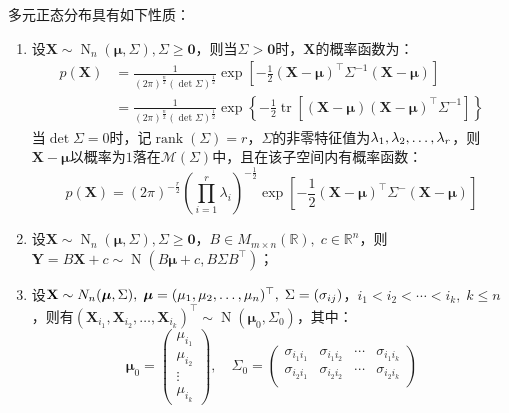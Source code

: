 \begin{property}\label{prop:MultiNormal}
	多元正态分布具有如下性质：
	\begin{enumerate}
		\item 设$\mathbf{X}\sim\operatorname{N}_n(\boldsymbol{\mu},\Sigma),\Sigma\geqslant\mathbf{0}$，则当$\Sigma>\mathbf{0}$时，$\mathbf{X}$的概率函数为：
		\begin{align*}
			p(\mathbf{X})&=\frac{1}{(2\pi)^{\frac{n}{2}}(\det\Sigma)^{\frac{1}{2}}}\exp\left[-\frac{1}{2}(\mathbf{X}-\boldsymbol{\mu})^{\top}\Sigma^{-1}(\mathbf{X}-\boldsymbol{\mu})\right] \\
			&=\frac{1}{(2\pi)^{\frac{n}{2}}(\det\Sigma)^{\frac{1}{2}}}\exp\left\{-\frac{1}{2}\operatorname{tr}[(\mathbf{X}-\boldsymbol{\mu})(\mathbf{X}-\boldsymbol{\mu})^{\top}\Sigma^{-1}]\right\}
		\end{align*}
		当$\det\Sigma=0$时，记$\operatorname{rank}(\Sigma)=r$，$\Sigma$的非零特征值为$\lambda_1, \lambda_2, \dots, \lambda_{r}$，则$\mathbf{X}-\boldsymbol{\mu}$以概率为$1$落在$\mathcal{M}(\Sigma)$中，且在该子空间内有概率函数：
		\begin{equation*}
			p(\mathbf{X})=(2\pi)^{-\frac{r}{2}}\left(\prod\limits_{i=1}^r\lambda_i\right)^{-\frac{1}{2}}\exp\left[-\frac{1}{2}(\mathbf{X}-\boldsymbol{\mu})^{\top}\Sigma^-(\mathbf{X}-\boldsymbol{\mu})\right]
		\end{equation*}
		\item 设$\mathbf{X}\sim\operatorname{N}_n(\boldsymbol{\mu},\Sigma),\Sigma\geqslant\mathbf{0}$，$B\in M_{m\times n}(\mathbb{R}),\;c\in\mathbb{R}^{n}$，则$\mathbf{Y}=B\mathbf{X}+c\sim \operatorname{N}(B\boldsymbol{\mu}+c,B\Sigma B^{\top})$；
		\item 设$\mathbf{X}\sim N_n(\boldsymbol{\mu},\Sigma),\;\boldsymbol{\mu}=(\mu_1, \mu_2, \dots, \mu_{n})^{\top},\;\Sigma=(\sigma_{ij})$，$i_1<i_2<\cdots<i_k,\;k\leqslant n$，则有$(\mathbf{X}_{i_1},\mathbf{X}_{i_2},\dots,\mathbf{X}_{i_k})^{\top}\sim \operatorname{N}(\boldsymbol{\mu}_0,\Sigma_0)$，其中：
		\begin{equation*}
			\boldsymbol{\mu}_0=
			\begin{pmatrix}
				\mu_{i_1} \\
				\mu_{i_2} \\
				\vdots \\
				\mu_{i_k}
			\end{pmatrix}
			,\quad
			\Sigma_0=
			\begin{pmatrix}
				\sigma_{i_1i_1} & \sigma_{i_1i_2} & \cdots & \sigma_{i_1i_k} \\
				\sigma_{i_2i_1} & \sigma_{i_2i_2} & \cdots & \sigma_{i_2i_k} \\

\end{pmatrix}
\end{equation*}
\end{enumerate}
\end{property}
